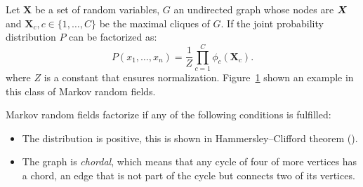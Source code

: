 Let \(\bm{X}\) be a set of random variables, \(G\) an undirected graph whose nodes are \(\bm{X}\) and \(\bm{X}_c, c \in \{1,\dots,C\}\) be the maximal cliques of \(G\). If the joint probability distribution \(P\) can be factorized as:
\[
P(x_1,\dots,x_n) = \frac{1}{Z}\prod_{ c = 1 }^{C}\phi_c(\bm{X}_c).
\]
where \(Z\) is a constant that ensures normalization. Figure~\ref{fig:mn_example} shown an example in this class of Markov random fields.

Markov random fields factorize if any of the following conditions is fulfilled:
\begin{itemize}
  \item The distribution is positive, this is shown in Hammersley–Clifford theorem (\cite{grimmett1973theorem}).
  \item The graph is \emph{chordal}, which means that any cycle of four of more vertices has a chord, an edge that is not part of the cycle but connects two of its vertices.
\end{itemize}


\begin{figure}[h]
\centering
{}
\label{fig:mn_example}
\end{figure}

